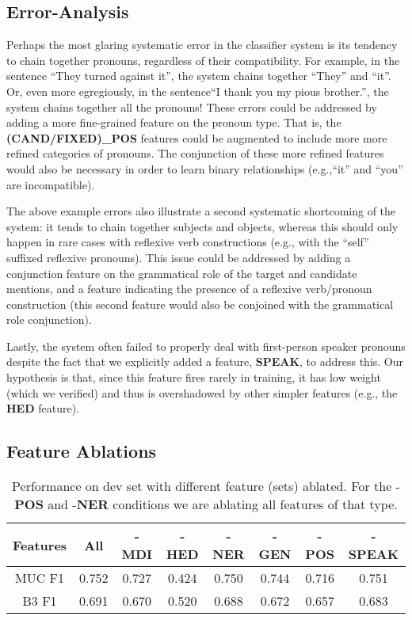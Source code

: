 \documentclass[12pt,a4paper]{article}
\begin{document}
\subsection{Error-Analysis}

Perhaps the most glaring systematic error in the classifier system is its tendency to chain together pronouns, regardless of their compatibility. 
For example, in the sentence ``They turned against it'', the system chains together ``They'' and ``it''.  
Or, even more egregiously, in the sentence``I thank you my pious brother.'', the system chains together all the pronouns! 
These errors could be addressed by adding a more fine-grained feature on the pronoun type. 
That is, the \textbf{(CAND/FIXED)\_POS} features could be augmented to include more more refined categories of pronouns. 
The conjunction of these more refined features would also be necessary in order to learn binary relationships (e.g.,``it'' and ``you'' are incompatible). 

The above example errors also illustrate a second systematic shortcoming of the system: it tends to chain together subjects and objects, whereas this should only happen in rare cases with reflexive verb constructions (e.g., with the ``self'' suffixed reflexive pronouns). 
This issue could be addressed by adding a conjunction feature on the grammatical role of the target and candidate mentions, and a feature indicating the presence of a reflexive verb/pronoun construction (this second feature would also be conjoined with the grammatical role conjunction).

Lastly, the system often failed to properly deal with first-person speaker pronouns despite the fact that we explicitly added a feature, \textbf{SPEAK},  to address this.
Our hypothesis is that, since this feature fires rarely in training, it has low weight (which we verified) and thus is overshadowed by other simpler features (e.g., the \textbf{HED} feature).

\subsection{Feature Ablations}

\begin{table}[h!]
\centering
\begin{tabular}{c||c|c|c|c|c|c|c|}
Features & All & -\textbf{MDI} & -\textbf{HED} &  -\textbf{NER} & -\textbf{GEN} & -\textbf{POS} & -\textbf{SPEAK}\\ 
\hline 
MUC F1& 0.752 & 0.727 & 0.424 &  0.750 & 0.744 & 0.716 & 0.751  \\ 
\hline 
B3 F1& 0.691 & 0.670 & 0.520 & 0.688 & 0.672 & 0.657 & 0.683\\ 
\hline 
\end{tabular} 
\caption{Performance on dev set with different feature (sets) ablated. For the -\textbf{POS} and -\textbf{NER} conditions we are ablating all features of that type.}
\end{table}
\end{document}
